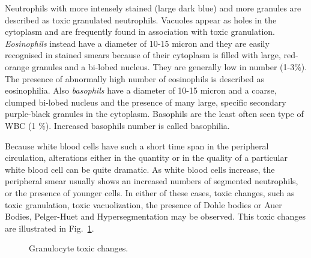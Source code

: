 \documentclass[final,a4paper,12pt,english]{UnicaPhdThesis3}
\begin{document}
Neutrophils with more intensely stained (large dark blue) and more granules are described as toxic granulated neutrophils. Vacuoles appear as holes in the cytoplasm and are frequently found in association with toxic granulation. \textit{Eosinophils} instead have a diameter of 10-15 micron and they are easily recognised in stained smears because of their cytoplasm is filled with large, red-orange granules and a bi-lobed nucleus. They are generally low in number (1-3\%). The presence of abnormally high number of eosinophils is described as eosinophilia. Also \textit{basophils} have a diameter of 10-15 micron and a coarse, clumped bi-lobed nucleus and the presence of many large, specific secondary purple-black granules in the cytoplasm. Basophils are the least often seen type of WBC (1	\%). Increased basophils number is called basophilia.

Because white blood cells have such a short time span in the peripheral circulation, alterations either in the quantity or in the quality of a particular white blood cell can be quite dramatic. As white blood cells increase, the peripheral smear usually shows an increased numbers of segmented neutrophils, or the presence of younger cells. In either of these cases, toxic changes, such as toxic granulation, toxic vacuolization, the presence of Dohle bodies or Auer Bodies, Pelger-Huet and Hypersegmentation may be observed. This toxic changes are illustrated in Fig.~\ref{fig:Changes}.


\begin{figure}[!htbp]
\centering
\caption{\label{fig:Changes} Granulocyte toxic changes.}
\end{figure}
\end{document}
